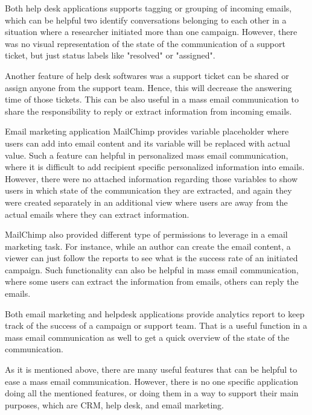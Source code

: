\begin{compactitem}
	\item Both help desk applications supports tagging or grouping of incoming emails, which can be helpful two identify conversations belonging to each other in a situation where a researcher initiated more than one campaign. However, there was no visual representation of the state of the communication of a support ticket, but just status labels like "resolved" or "assigned".
	\item Another feature of help desk softwares was a support ticket can be shared or assign anyone from the support team. Hence, this will decrease the answering time of those tickets. This can be also useful in a mass email communication to share the responsibility to reply or extract information from incoming emails.
	\item Email marketing application MailChimp provides variable placeholder where users can add into email content and its variable will be replaced with actual value. Such a feature can helpful in personalized mass email communication, where it is difficult to add recipient specific personalized information into emails. However, there were no attached information regarding those variables to show users in which state of the communication they are extracted, and again they were created separately in an additional view where users are away from the actual emails where they can extract information.
	\item MailChimp also provided different type of permissions to leverage in a email marketing task. For instance, while an author can create the email content, a viewer can just follow the reports to see what is the success rate of an initiated campaign. Such functionality can also be helpful in mass email communication, where some users can extract the information from emails, others can reply the emails.
	\item Both email marketing and helpdesk applications provide analytics report to keep track of the success of a campaign or support team. That is a useful function in a mass email communication as well to get a quick overview of the state of the communication.
\end{compactitem}

As it is mentioned above, there are many useful features that can be helpful to ease a mass email communication. However, there is no one specific application doing all the mentioned features, or doing them in a way to support their main purposes, which are \ac{CRM}, help desk, and email marketing.

